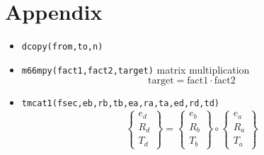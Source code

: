 \documentclass{cern-art} %
\renewcommand{\L}[1]{\lstinline[firstnumber=last]{#1}}
\begin{document}
\section{Appendix}
\begin{itemize}
\item[-] \L{dcopy(from,to,n)}
\item[-] \L{m66mpy(fact1,fact2,target)} matrix multiplication $$\text{target} = \text{fact1} \cdot \text{fact2}$$
\item[-] \L{tmcat1(fsec,eb,rb,tb,ea,ra,ta,ed,rd,td)}$$\left\{ \begin{array}{c}
e_{d}\\
R_{d}\\
T_{d}
\end{array}\right\} =\left\{ \begin{array}{c}
e_{b}\\
R_{b}\\
T_{b}
\end{array}\right\} \circ \left\{ \begin{array}{c}
e_{a}\\
R_{a}\\
T_{a}
\end{array}\right\} $$
\end{itemize}
\end{document}
